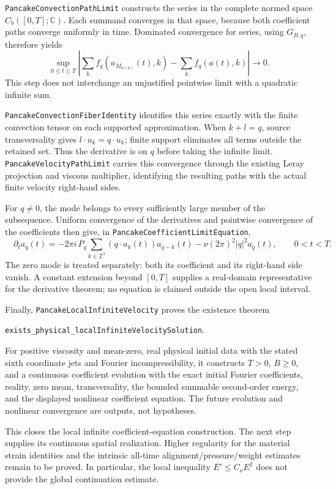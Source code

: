 \documentclass[11pt]{article}
\theoremstyle{definition}
\begin{document}
\texttt{PancakeConvectionPathLimit} constructs the series in the complete
normed space $C_b([0,T];\mathbb C)$. Each summand converges in that space,
because both coefficient paths converge uniformly in time. Dominated
convergence for series, using $G_{B,q}$, therefore yields
\[
 \sup_{0\le t\le T}
 \left|\sum_k f_q(u_{M_{\phi(n)}}(t),k)
              -\sum_k f_q(a(t),k)\right|\longrightarrow0 .
\]
This step does not interchange an unjustified pointwise limit with a
quadratic infinite sum.

\texttt{PancakeConvectionFiberIdentity} identifies this series exactly with
the finite convection tensor on each supported approximation. When $k+l=q$,
source transversality gives $l\cdot u_k=q\cdot u_k$; finite support eliminates
all terms outside the retained set. Thus the derivative is on $q$ before
taking the infinite limit.
\texttt{PancakeVelocityPathLimit} carries this convergence through the
existing Leray projection and viscous multiplier, identifying the resulting
paths with the actual finite velocity right-hand sides.

For $q\ne0$, the mode belongs to every sufficiently large member of the
subsequence. Uniform convergence of the derivatives and pointwise
convergence of the coefficients then give, in
\texttt{PancakeCoefficientLimitEquation},
\[
 \boxed{\quad
 \partial_t a_q(t)
   =-2\pi i\,P_q\sum_{k\in\mathbb Z^3}(q\cdot a_k(t))a_{q-k}(t)
      -\nu(2\pi)^2|q|^2a_q(t),\qquad 0<t<T.
 \quad}
\]
The zero mode is treated separately: both its coefficient and its
right-hand side vanish. A constant extension beyond $[0,T]$ supplies a
real-domain representative for the derivative theorem; no equation is
claimed outside the open local interval.

Finally, \texttt{PancakeLocalInfiniteVelocity} proves the existence theorem
\begin{center}
\texttt{exists\_physical\_localInfiniteVelocitySolution}.
\end{center}
For positive viscosity and mean-zero, real physical initial data with the
stated sixth coordinate jets and Fourier incompressibility, it constructs
$T>0$, $B\ge0$, and a continuous coefficient evolution with the exact initial
Fourier coefficients, reality, zero mean, transversality, the bounded
summable second-order energy, and the displayed nonlinear coefficient
equation. The future evolution and nonlinear convergence are outputs, not
hypotheses.

This closes the local infinite coefficient-equation construction. The next
step supplies its continuous spatial realization. Higher regularity for the
material strain identities and the intrinsic all-time alignment/pressure/weight
estimates remain to be proved. In particular, the local inequality
$E'\le C_\nu E^2$ does not provide the global continuation estimate.
\end{document}
